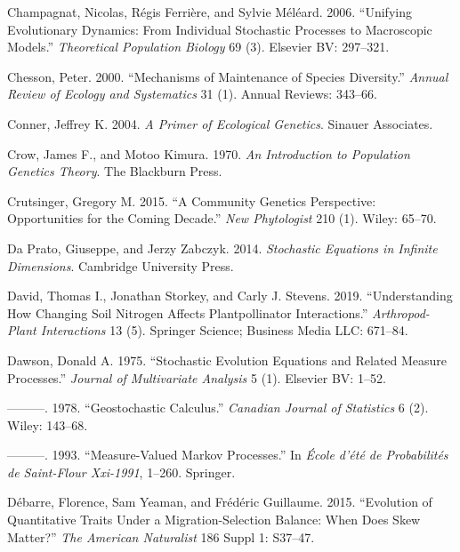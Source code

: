 \documentclass[]{article}
\begin{document}
\leavevmode\hypertarget{ref-Champagnat2006}{}%
Champagnat, Nicolas, Régis Ferrière, and Sylvie Méléard. 2006.
``Unifying Evolutionary Dynamics: From Individual Stochastic Processes
to Macroscopic Models.'' \emph{Theoretical Population Biology} 69 (3).
Elsevier BV: 297--321.

\leavevmode\hypertarget{ref-Chesson2000}{}%
Chesson, Peter. 2000. ``Mechanisms of Maintenance of Species
Diversity.'' \emph{Annual Review of Ecology and Systematics} 31 (1).
Annual Reviews: 343--66.

\leavevmode\hypertarget{ref-jeffreyconner2004}{}%
Conner, Jeffrey K. 2004. \emph{A Primer of Ecological Genetics}. Sinauer
Associates.

\leavevmode\hypertarget{ref-9781932846126}{}%
Crow, James F., and Motoo Kimura. 1970. \emph{An Introduction to
Population Genetics Theory}. The Blackburn Press.

\leavevmode\hypertarget{ref-Crutsinger2015}{}%
Crutsinger, Gregory M. 2015. ``A Community Genetics Perspective:
Opportunities for the Coming Decade.'' \emph{New Phytologist} 210 (1).
Wiley: 65--70.

\leavevmode\hypertarget{ref-DaPrato2014}{}%
Da Prato, Giuseppe, and Jerzy Zabczyk. 2014. \emph{Stochastic Equations
in Infinite Dimensions}. Cambridge University Press.

\leavevmode\hypertarget{ref-David2019}{}%
David, Thomas I., Jonathan Storkey, and Carly J. Stevens. 2019.
``Understanding How Changing Soil Nitrogen Affects Plantpollinator
Interactions.'' \emph{Arthropod-Plant Interactions} 13 (5). Springer
Science; Business Media LLC: 671--84.

\leavevmode\hypertarget{ref-Dawson1975}{}%
Dawson, Donald A. 1975. ``Stochastic Evolution Equations and Related
Measure Processes.'' \emph{Journal of Multivariate Analysis} 5 (1).
Elsevier BV: 1--52.

\leavevmode\hypertarget{ref-Dawson1978}{}%
---------. 1978. ``Geostochastic Calculus.'' \emph{Canadian Journal of
Statistics} 6 (2). Wiley: 143--68.

\leavevmode\hypertarget{ref-dawson1993measure}{}%
---------. 1993. ``Measure-Valued Markov Processes.'' In \emph{École
d'été de Probabilités de Saint-Flour Xxi-1991}, 1--260. Springer.

\leavevmode\hypertarget{ref-Dbarre2015EvolutionOQ}{}%
Débarre, Florence, Sam Yeaman, and Frédéric Guillaume. 2015. ``Evolution
of Quantitative Traits Under a Migration-Selection Balance: When Does
Skew Matter?'' \emph{The American Naturalist} 186 Suppl 1: S37--47.
\end{document}
